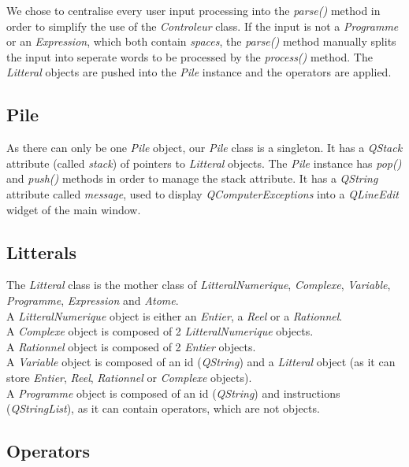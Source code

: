 \documentclass[titlepage]{article}
\begin{document}
    We chose to centralise every user input processing into the \textit{parse()} method in order to simplify the use of the \textit{Controleur} class. If the input is not a \textit{Programme} or an \textit{Expression}, which both contain \textit{spaces}, the \textit{parse()} method manually splits the input into seperate words to be processed by the \textit{process()} method. The \textit{Litteral} objects are pushed into the \textit{Pile} instance and the operators are applied.

    \subsection{Pile}

    As there can only be one \textit{Pile} object, our \textit{Pile} class is a singleton. It has a \textit{QStack} attribute (called \textit{stack}) of pointers to \textit{Litteral} objects. The \textit{Pile} instance has \textit{pop()} and \textit{push()} methods in order to manage the stack attribute. It has a \textit{QString} attribute called \textit{message}, used to display \textit{QComputerExceptions} into a \textit{QLineEdit} widget of the main window.

    \subsection{Litterals}

    The \textit{Litteral} class is the mother class of \textit{LitteralNumerique}, \textit{Complexe}, \textit{Variable}, \textit{Programme}, \textit{Expression} and \textit{Atome}.\\
    A \textit{LitteralNumerique} object is either an \textit{Entier}, a \textit{Reel} or a \textit{Rationnel}. \\
    A \textit{Complexe} object is composed of 2 \textit{LitteralNumerique} objects.\\
    A \textit{Rationnel} object is composed of 2 \textit{Entier} objects.\\
    A \textit{Variable} object is composed of an id (\textit{QString}) and a \textit{Litteral} object (as it can store \textit{Entier}, \textit{Reel}, \textit{Rationnel} or \textit{Complexe} objects).\\
    A \textit{Programme} object is composed of an id (\textit{QString}) and instructions (\textit{QStringList}), as it can contain operators, which are not objects.

    \subsection{Operators}
\end{document}
